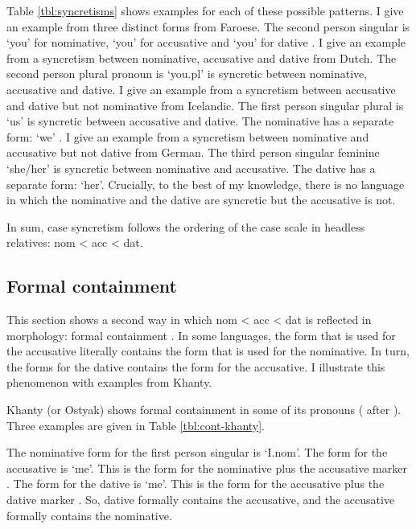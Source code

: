 Table \ref{tbl:syncretisms} shows examples for each of these possible patterns.
I give an example from three distinct forms from Faroese. The second person singular is  `you' for nominative,  `you' for accusative and  `you' for dative .
I give an example from a syncretism between nominative, accusative and dative from Dutch. The second person plural pronoun is  `you.\ac{pl}' is syncretic between nominative, accusative and dative.
I give an example from a syncretism between accusative and dative but not nominative from Icelandic. The first person singular plural is  `us' is syncretic between accusative and dative. The nominative has a separate form:  `we' .
I give an example from a syncretism between nominative and accusative but not dative from German. The third person singular feminine  `she/her' is syncretic between nominative and accusative. The dative has a separate form:  `her'.
Crucially, to the best of my knowledge, there is no language in which the nominative and the dative are syncretic but the accusative is not.

\begin{table}[ht]
  \center
  \caption {}
    
  \label{tbl:syncretisms}
\end{table}

In sum, case syncretism follows the ordering of the case scale in headless relatives: \ac{nom} < \ac{acc} < \ac{dat}.


\subsection{Formal containment}

This section shows a second way in which \ac{nom} < \ac{acc} < \ac{dat} is reflected in morphology: formal containment \citep[cf.][]{smith2019,zompi2017,caha2010}. In some languages, the form that is used for the accusative literally contains the form that is used for the nominative. In turn, the forms for the dative contains the form for the accusative. I illustrate this phenomenon with examples from Khanty.

Khanty (or Ostyak) shows formal containment in some of its pronouns ( after \citealt{smith2019}). Three examples are given in Table \ref{tbl:cont-khanty}.

The nominative form for the first person singular is  `I.\ac{nom}'. The form for the accusative is  `me'. This is the form for the nominative  plus the accusative marker . The form for the dative is  `me'. This is the form for the accusative  plus the dative marker . So, dative formally contains the accusative, and the accusative formally contains the nominative.

